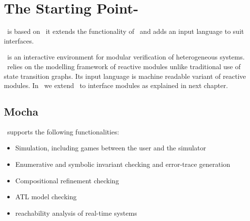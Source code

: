 \chapter{The Starting Point- \mocha}
\chai \ is based on \mocha \, it extends the functionality of
\mocha \ and adds an input language to suit interfaces.

\mocha \ is an interactive environment for modular verification of
heterogeneous systems. \mocha \ relies on the modelling framework
of reactive modules unlike traditional use of state transition
graphs. Its input language is machine readable variant of reactive
modules. In \chai \ we extend \rm \ to interface modules as
explained in next chapter.

\section{Mocha}

\mocha \ supports the following functionalities:
\begin{itemize}
\item Simulation, including games between the user and the
simulator \item Enumerative and symbolic invariant checking and
error-trace generation \item Compositional refinement checking
\item ATL model checking \item reachability analysis of real-time
systems
\end{itemize}

